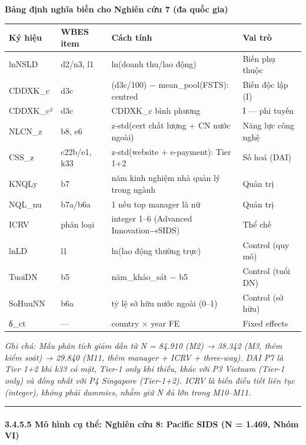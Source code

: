 \documentclass[12pt,a4paper]{article}
\begin{document}
\textbf{Bảng định nghĩa biến cho Nghiên cứu 7 (đa quốc gia)}

\begin{longtable}[]{@{}llll@{}}
\toprule\noalign{}
Ký hiệu & WBES item & Cách tính & Vai trò \\
\midrule\noalign{}
\endhead
\bottomrule\noalign{}
\endlastfoot
lnNSLD & d2/n3, l1 & ln(doanh thu/lao động) & Biến phụ thuộc \\
CDDXK\_c & d3c & (d3c/100) − mean\_pool(FSTS): centred & Biến độc lập
(I) \\
CDDXK\_c² & d3c & CDDXK\_c bình phương & I --- phi tuyến \\
NLCN\_z & b8, e6 & z-std(cert chất lượng + CN nước ngoài) & Năng lực
công nghệ \\
CSS\_z & c22b/e1, k33 & z-std(website + e-payment): Tier 1+2 & Số hoá
(DAI) \\
KNQLy & b7 & năm kinh nghiệm nhà quản lý trong ngành & Quản trị \\
NQL\_nu & b7a/b6a & 1 nếu top manager là nữ & Quản trị \\
ICRV & phân loại & integer 1--6 (Advanced Innovation→SIDS) & Thể chế \\
lnLD & l1 & ln(lao động thường trực) & Control (quy mô) \\
TuoiDN & b5 & năm\_khảo\_sát − b5 & Control (tuổi DN) \\
SoHuuNN & b6a & tỷ lệ sở hữu nước ngoài (0--1) & Control (sở hữu) \\
δ\_ct & --- & country × year FE & Fixed effects \\
\end{longtable}

\emph{Ghi chú: Mẫu phân tích giảm dần từ N = 84.910 (M2) → 38.342 (M3,
thêm kiểm soát) → 29.840 (M11, thêm manager + ICRV + three-way). DAI P7
là Tier 1+2 khi k33 có mặt, Tier-1 only khi thiếu, khác với P3 Vietnam
(Tier-1 only) và đồng nhất với P4 Singapore (Tier-1+2). ICRV là biến
điều tiết liên tục (integer), không phải dummies, nhằm giữ N đủ lớn
trong M10--M11.}

\begin{center}\rule{0.5\linewidth}{0.5pt}\end{center}

\hypertarget{3455-muxf4-huxecnh-cux1ee5-thux1ec3-nghiuxean-cux1ee9u-8-pacific-sids-n--1469-nhuxf3m-vi}{%
\paragraph{3.4.5.5 Mô hình cụ thể: Nghiên cứu 8: Pacific SIDS (N =
1.469, Nhóm
VI)}\label{3455-muxf4-huxecnh-cux1ee5-thux1ec3-nghiuxean-cux1ee9u-8-pacific-sids-n--1469-nhuxf3m-vi}}
\end{document}
